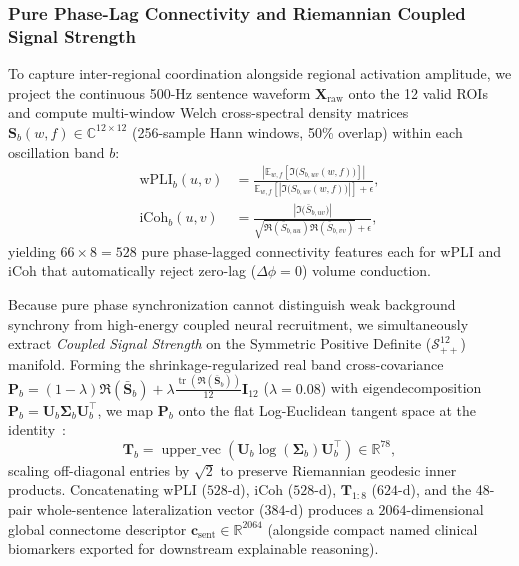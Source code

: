 \documentclass[journal]{IEEEtran}
\begin{document}
\subsubsection{Pure Phase-Lag Connectivity and Riemannian Coupled Signal Strength}
To capture inter-regional coordination alongside regional activation amplitude, we project the continuous 500-Hz sentence waveform $\mathbf{X}_{\text{raw}}$ onto the 12 valid ROIs and compute multi-window Welch cross-spectral density matrices $\mathbf{S}_b(w, f) \in \mathbb{C}^{12 \times 12}$ (256-sample Hann windows, 50\% overlap) within each oscillation band $b$:
\begin{align}
    \text{wPLI}_b(u,v) &= \frac{\left|\mathbb{E}_{w,f}\!\left[\Im\big(S_{b,uv}(w,f)\big)\right]\right|}{\mathbb{E}_{w,f}\!\left[\left|\Im\big(S_{b,uv}(w,f)\big)\right|\right] + \epsilon}, \\
    \text{iCoh}_b(u,v) &= \frac{\left|\Im\big(\bar{S}_{b,uv}\big)\right|}{\sqrt{\Re(\bar{S}_{b,uu})\Re(\bar{S}_{b,vv})} + \epsilon},
\end{align}
yielding $66 \times 8 = 528$ pure phase-lagged connectivity features each for wPLI and iCoh that automatically reject zero-lag ($\Delta\phi=0$) volume conduction.

Because pure phase synchronization cannot distinguish weak background synchrony from high-energy coupled neural recruitment, we simultaneously extract \textit{Coupled Signal Strength} on the Symmetric Positive Definite ($\mathcal{S}_{++}^{12}$) manifold. Forming the shrinkage-regularized real band cross-covariance $\mathbf{P}_b = (1-\lambda)\Re(\bar{\mathbf{S}}_b) + \lambda \frac{\operatorname{tr}(\Re(\bar{\mathbf{S}}_b))}{12}\mathbf{I}_{12}$ ($\lambda=0.08$) with eigendecomposition $\mathbf{P}_b = \mathbf{U}_b \boldsymbol{\Sigma}_b \mathbf{U}_b^\top$, we map $\mathbf{P}_b$ onto the flat Log-Euclidean tangent space at the identity~\cite{arsigny2006logeuclidean}:
\begin{equation}
    \mathbf{T}_b = \operatorname{upper\_vec}\!\left(\mathbf{U}_b \log(\boldsymbol{\Sigma}_b) \mathbf{U}_b^\top\right) \in \mathbb{R}^{78},
\end{equation}
scaling off-diagonal entries by $\sqrt{2}$ to preserve Riemannian geodesic inner products. Concatenating $\text{wPLI}$ ($528$-d), $\text{iCoh}$ ($528$-d), $\mathbf{T}_{1:8}$ ($624$-d), and the 48-pair whole-sentence lateralization vector ($384$-d) produces a $2064$-dimensional global connectome descriptor $\mathbf{c}_{\text{sent}} \in \mathbb{R}^{2064}$ (alongside compact named clinical biomarkers exported for downstream explainable reasoning).
\end{document}
